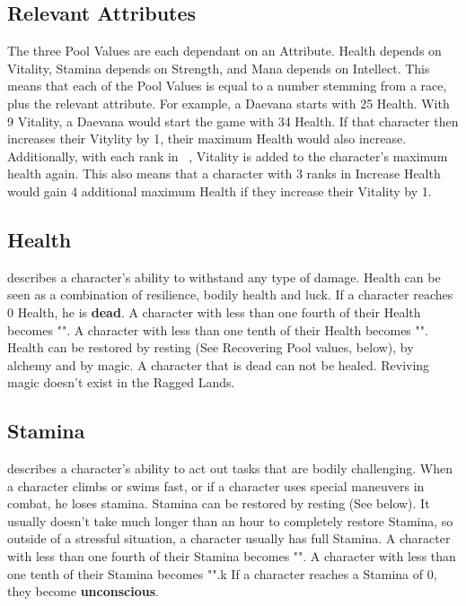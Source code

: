\subsection{Relevant Attributes}\label{subsec:relevantAttributesPools}
The three Pool Values are each dependant on an Attribute.
Health depends on Vitality, Stamina depends on Strength, and Mana depends on Intellect.
This means that each of the Pool Values is equal to a number stemming from a race, plus the relevant attribute.
For example, a Daevana starts with 25 Health.
With 9 Vitality, a Daevana would start the game with 34 Health.
If that character then increases their Vitylity by 1, their maximum Health would also increase.
Additionally, with each rank in ~, Vitality is added to the character's maximum health again.
This also means that a character with 3 ranks in Increase Health would gain 4 additional maximum Health if they increase their Vitality by 1.

\subsection{Health}\label{pool:health} describes a character's ability to withstand any type of damage.
Health can be seen as a combination of resilience, bodily health and luck.
If a character reaches 0 Health, he is \textbf{dead}.
A character with less than one fourth of their Health becomes "".
A character with less than one tenth of their Health becomes "".
Health can be restored by resting (See Recovering Pool values, below), by alchemy and by magic.
A character that is dead can not be healed.
Reviving magic doesn't exist in the Ragged Lands.\\

\subsection{Stamina}\label{pool:stamina} describes a character's ability to act out tasks that are bodily challenging.
When a character climbs or swims fast, or if a character uses special maneuvers in combat, he loses stamina.
Stamina can be restored by resting (See below).
It usually doesn't take much longer than an hour to completely restore Stamina, so outside of a stressful situation, a character usually has full Stamina.
A character with less than one fourth of their Stamina becomes "".
A character with less than one tenth of their Stamina becomes "".k
If a character reaches a Stamina of 0, they become \textbf{unconscious}.\\

